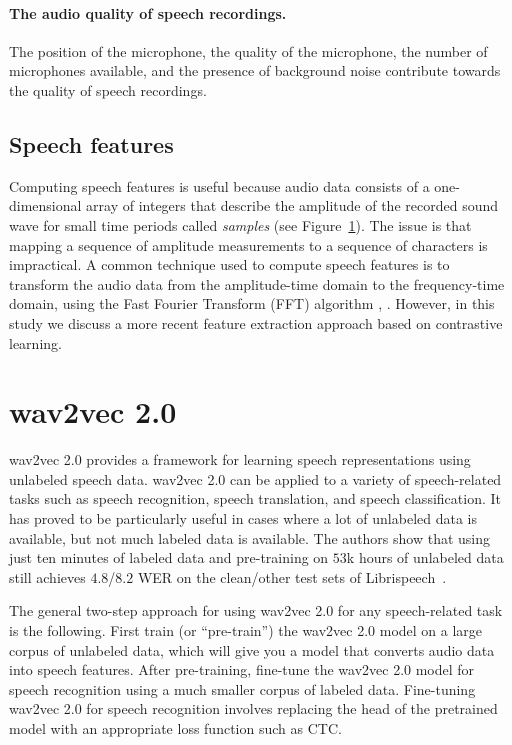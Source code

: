 \paragraph*{The audio quality of speech recordings.} The position of the microphone, the quality of the microphone, 
the number of microphones available, and the presence of background noise contribute towards the quality of speech recordings.



\subsection{Speech features}
Computing speech features is useful because audio data consists of a one-dimensional array of integers that describe the
amplitude of the recorded sound wave for small time periods called \emph{samples} (see Figure~\ref{}). 
The issue is that mapping a sequence of amplitude measurements to a sequence of characters is impractical. 
A common technique used to compute speech features is to transform the audio data from the amplitude-time domain 
to the frequency-time domain, using the Fast Fourier Transform (FFT) algorithm \cite{cochran1967fast}, \cite{cooley1969fast}.
However, in this study we discuss a more recent feature extraction approach based on contrastive learning.



\section{wav2vec 2.0}
wav2vec 2.0 provides a framework for learning speech representations using unlabeled speech data.
wav2vec 2.0 can be applied to a variety of speech-related tasks such as speech recognition, speech translation,
and speech classification.
It has proved to be particularly useful in cases where a lot of unlabeled data is available, but not much labeled data is available.
The authors show that using just ten minutes of labeled data and pre-training
on $53$k hours of unlabeled data still achieves $4.8$/$8.2$ WER on the clean/other test sets of Librispeech~\cite{}.

The general two-step approach for using wav2vec 2.0 for any speech-related task is the following.
First train (or ``pre-train'') the wav2vec 2.0 model on a large corpus of unlabeled data, which
will give you a model that converts audio data into speech features.
After pre-training, fine-tune the wav2vec 2.0 model for speech recognition using a much smaller corpus of labeled data. 
Fine-tuning wav2vec 2.0 for speech recognition involves replacing the head of the pretrained model with
an appropriate loss function such as CTC.

